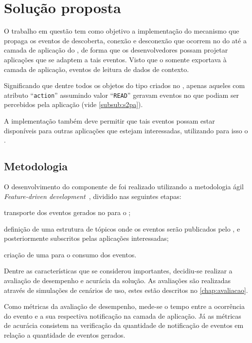\chapter{Solução proposta}\label{chap:solucao}

O trabalho em questão tem como objetivo a implementação do mecanismo que propaga os eventos de descoberta, conexão e desconexão que ocorrem no \stwopa do \mhub até a camada de aplicação do \cddl, de forma que os desenvolvedores possam projetar aplicações que se adaptem a tais eventos.
Visto que o \cddl somente exportava à camada de aplicação, eventos de leitura de dados de contexto.

Significando que dentre todos os objetos do tipo \sensordata criados no \stwopa, apenas aqueles com atributo ``\texttt{action}'' assumindo valor ``\texttt{READ}'' geravam eventos no \cddl que podiam ser percebidos pela aplicação (vide \autoref{subsub:s2pa}).

A implementação também deve permitir que tais eventos possam estar disponíveis para outras aplicações que estejam interessadas, utilizando para isso o \mqtt.

\section{Metodologia} \label{sec:metodologia}

O desenvolvimento do componente de \software foi realizado utilizando a metodologia ágil \textit{Feature-driven development}~\cite{coad:luca:lefebvre:1999}, dividido nas seguintes etapas:

\begin{alineas}
	\item transporte dos eventos gerados no \stwopa para o \cddl;

	\item definição de uma estrutura de tópicos onde os eventos serão publicados pelo \cddl, e posteriormente subscritos pelas aplicações interessadas;

	\item criação de uma \api para o consumo dos eventos.
\end{alineas}

Dentre as características que se considerou importantes, decidiu-se realizar a avaliação de desempenho e acurácia da solução.
As avaliações são realizadas através de simulações de cenários de uso, estes estão descritos no \autoref{chap:avaliacao}.

Como métricas da avaliação de desempenho, mede-se o tempo entre a ocorrência do evento e a sua respectiva notificação na camada de aplicação. Já as métricas de acurácia consistem na verificação da quantidade de notificação de eventos em relação a quantidade de eventos gerados.

